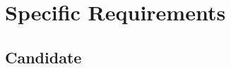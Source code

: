 \documentclass[10pt]{article}
\begin{document}
\section{Specific Requirements}

\subsection{Candidate}
\end{document}
